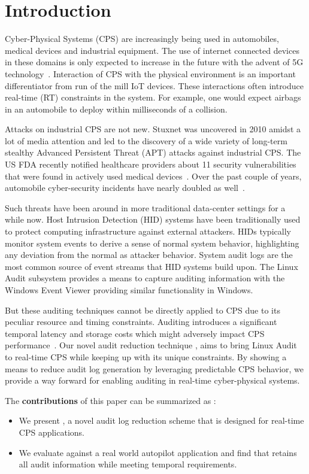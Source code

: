 \section{Introduction}
\label{sec:introduction}

Cyber-Physical Systems (CPS) are increasingly being used in automobiles, medical devices and industrial equipment. The use of internet connected devices in these domains is only expected to increase in the future with the advent of 5G technology~\cite{cps_sec_1}. Interaction of CPS with the physical environment is an important differentiator from run of the mill IoT devices. These interactions often introduce real-time (RT) constraints in the system. For example, one would expect airbags in an automobile to deploy within milliseconds of a collision.

Attacks on industrial CPS are not new. Stuxnet was uncovered in 2010 \cite{stuxnet} amidst a lot of media attention and led to the discovery of a wide variety of long-term stealthy Advanced Persistent Threat (APT) attacks against industrial CPS. The US FDA recently notified healthcare providers about 11 security vulnerabilities that were found in actively used medical devices~\cite{cps_sec_3}. Over the past couple of years, automobile cyber-security incidents have nearly doubled as well~\cite{cps_sec_2}.

Such threats have been around in more traditional data-center settings for a while now. Host Intrusion Detection (HID) systems have been traditionally used to protect computing infrastructure against external attackers. HIDs typically monitor system events to derive a sense of normal system behavior, highlighting any deviation from the normal as attacker behavior. System audit logs are the most common source of event streams that HID systems build upon. The Linux Audit subsystem provides a means to capture auditing information with the Windows Event Viewer providing similar functionality in Windows.

But these auditing techniques cannot be directly applied to CPS due to its peculiar resource and timing constraints. Auditing introduces a significant temporal latency and storage costs which might adversely impact CPS performance~\cite{maUsenix18}. Our novel audit reduction technique \Sys, aims to bring Linux Audit to real-time CPS while keeping up with its unique constraints. By showing a means to reduce audit log generation by leveraging predictable CPS behavior, we provide a way forward for enabling auditing in real-time cyber-physical systems.


The \textbf{contributions} of this paper can be summarized as :
\begin{itemize}
    \item We present \Sys, a novel audit log reduction scheme that is designed for real-time CPS applications.
    \item We evaluate \Sys against a real world autopilot application and find that \Sys retains all audit information while meeting temporal requirements.
\end{itemize}

